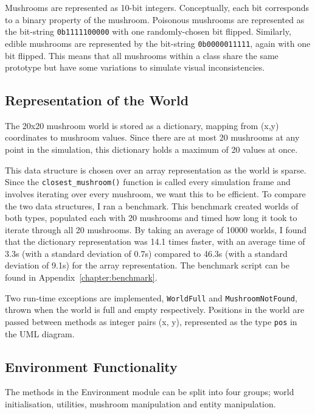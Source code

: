 \documentclass[12pt,a4paper]{report}
\begin{document}
Mushrooms are represented as 10-bit integers. Conceptually, each bit corresponds to a binary property of the mushroom. Poisonous mushrooms are represented as the bit-string \verb!0b1111100000! with one randomly-chosen bit flipped. Similarly, edible mushrooms are represented by the bit-string \verb~0b0000011111~, again with one bit flipped. This means that all mushrooms within a class share the same prototype but have some variations to simulate visual inconsistencies. %

\subsection{Representation of the World}\label{section:representation-of-world}

The 20x20 mushroom world is stored as a dictionary, mapping from (x,y) coordinates to mushroom values. Since there are at most 20 mushrooms at any point in the simulation, this dictionary holds a maximum of 20 values at once.

This data structure is chosen over an array representation as the world is sparse. Since the \texttt{closest\_mushroom()} function is called every simulation frame and involves iterating over every mushroom, we want this to be efficient. To compare the two data structures, I ran a benchmark. This benchmark created worlds of both types, populated each with 20 mushrooms and timed how long it took to iterate through all 20 mushrooms. By taking an average of 10000 worlds, I found that the dictionary representation was 14.1 times faster, with an average time of 3.3\textmu s (with a standard deviation of 0.7\textmu s) compared to 46.3\textmu s (with a standard deviation of 9.1\textmu s) for the array representation. The benchmark script can be found in Appendix~\ref{chapter:benchmark}.

Two run-time exceptions are implemented, \texttt{WorldFull} and \texttt{MushroomNotFound}, thrown when the world is full and empty respectively. Positions in the world are passed between methods as integer pairs (x, y), represented as the type \texttt{pos} in the UML diagram.

\subsection{Environment Functionality}

The methods in the Environment module can be split into four groups; world initialisation, utilities, mushroom manipulation and entity manipulation.
\end{document}

